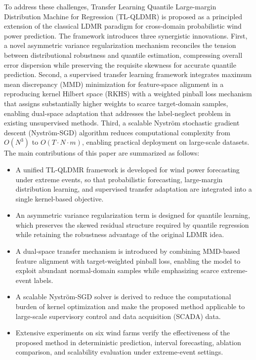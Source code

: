 \documentclass[a4paper]{cas-sc}
\begin{document}
To address these challenges, Transfer Learning Quantile Large-margin Distribution Machine for Regression (TL-QLDMR) is proposed as a principled extension of the classical LDMR paradigm for cross-domain probabilistic wind power prediction. The framework introduces three synergistic innovations. First, a novel asymmetric variance regularization mechanism reconciles the tension between distributional robustness and quantile estimation, compressing overall error dispersion while preserving the requisite skewness for accurate quantile prediction. Second, a supervised transfer learning framework integrates maximum mean discrepancy (MMD) minimization for feature-space alignment in a reproducing kernel Hilbert space (RKHS) with a weighted pinball loss mechanism that assigns substantially higher weights to scarce target-domain samples, enabling dual-space adaptation that addresses the label-neglect problem in existing unsupervised methods. Third, a scalable Nystr\"{o}m stochastic gradient descent (Nystr\"{o}m-SGD) algorithm reduces computational complexity from $O(N^3)$ to $O(T \cdot N \cdot m)$, enabling practical deployment on large-scale datasets. The main contributions of this paper are summarized as follows:

\begin{itemize}
    \item A unified TL-QLDMR framework is developed for wind power forecasting under extreme events, so that probabilistic forecasting, large-margin distribution learning, and supervised transfer adaptation are integrated into a single kernel-based objective.
    \item An asymmetric variance regularization term is designed for quantile learning, which preserves the skewed residual structure required by quantile regression while retaining the robustness advantage of the original LDMR idea.
    \item A dual-space transfer mechanism is introduced by combining MMD-based feature alignment with target-weighted pinball loss, enabling the model to exploit abundant normal-domain samples while emphasizing scarce extreme-event labels.
    \item A scalable Nystr\"{o}m-SGD solver is derived to reduce the computational burden of kernel optimization and make the proposed method applicable to large-scale supervisory control and data acquisition (SCADA) data.
    \item Extensive experiments on six wind farms verify the effectiveness of the proposed method in deterministic prediction, interval forecasting, ablation comparison, and scalability evaluation under extreme-event settings.
\end{itemize}
\end{document}
